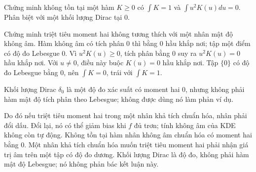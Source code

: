 \begin{problem}\label{k:51}
Chứng minh không tồn tại một hàm $K\ge0$ có $\int K=1$ và $\int u^2K(u)du=0$. Phân biệt với một khối lượng Dirac tại 0.
\end{problem}
\begin{solution}
Chứng minh triệt tiêu moment hai không tương thích với một nhân mật độ không âm.
Hàm không âm có tích phân 0 thì bằng 0 hầu khắp nơi; tập một điểm có độ đo Lebesgue 0.
Vì $u^2K(u)\ge0$, tích phân bằng 0 suy ra $u^2K(u)=0$ hầu khắp nơi. Với $u\ne0$, điều này buộc $K(u)=0$ hầu khắp nơi. Tập $\{0\}$ có độ đo Lebesgue bằng 0, nên $\int K=0$, trái với $\int K=1$.

Khối lượng Dirac $\delta_0$ là một độ đo xác suất có moment hai 0, nhưng không phải hàm mật độ tích phân theo Lebesgue; không được dùng nó làm phản ví dụ.

Do đó nếu triệt tiêu moment hai trong một nhân khả tích chuẩn hóa, nhân phải đổi dấu. Đổi lại, nó có thể giảm bias khi $f$ đủ trơn; tính không âm của KDE không còn tự động.
Không tồn tại hàm nhân không âm chuẩn hóa có moment hai bằng 0. Một nhân khả tích chuẩn hóa muốn triệt tiêu moment hai phải nhận giá trị âm trên một tập có độ đo dương.
Khối lượng Dirac là độ đo, không phải hàm mật độ Lebesgue; nó không phản bác kết luận này.
\end{solution}

